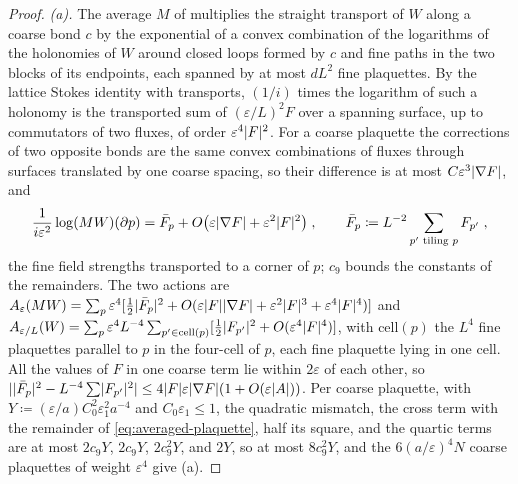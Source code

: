 \documentclass[11pt]{preprint}
\DeclarePairedDelimiter{\abs}{\lvert}{\rvert}
\numberwithin{equation}{section}
\theoremstyle{definition}
\theoremstyle{remark}
\theoremstyle{plain}
\begin{document}
\begin{proof}
\emph{(a).} The average $M$ of \cite[(0.4), p.~253]{BalabanRG1} multiplies the straight transport of $W$ along a coarse bond $c$ by the exponential of a convex combination of the logarithms of the holonomies of $W$ around closed loops formed by $c$ and fine paths in the two blocks of its endpoints, each spanned by at most $dL^2$ fine plaquettes. By the lattice Stokes identity with transports, $(1/i)$ times the logarithm of such a holonomy is the transported sum of $(\varepsilon/L)^2F$ over a spanning surface, up to commutators of two fluxes, of order $\varepsilon^4\abs F^2$. For a coarse plaquette the corrections of two opposite bonds are the same convex combinations of fluxes through surfaces translated by one coarse spacing, so their difference is at most $C\varepsilon^3\abs{\nabla F}$, and
\begin{equation}\label{eq:averaged-plaquette}
    \frac{1}{i\varepsilon^2}\log(MW)(\partial p) = \bar F_p + O\bigl(\varepsilon\abs{\nabla F} + \varepsilon^2\abs F^2\bigr)\;,
    \qquad
    \bar F_p \coloneqq L^{-2}\sum_{p' \text{ tiling } p}F_{p'}\;,
\end{equation}
the fine field strengths transported to a corner of $p$; $c_9$ bounds the constants of the remainders. The two actions are $A_\varepsilon(MW) = \sum_p\varepsilon^4[\frac12\abs{\bar F_p}^2 + O(\varepsilon\abs F\abs{\nabla F} + \varepsilon^2\abs F^3 + \varepsilon^4\abs F^4)]$ and $A_{\varepsilon/L}(W) = \sum_p\varepsilon^4L^{-4}\sum_{p' \in \mathrm{cell}(p)}[\frac12\abs{F_{p'}}^2 + O(\varepsilon^4\abs F^4)]$, with $\mathrm{cell}(p)$ the $L^4$ fine plaquettes parallel to $p$ in the four-cell of $p$, each fine plaquette lying in one cell. All the values of $F$ in one coarse term lie within $2\varepsilon$ of each other, so $\abs{\abs{\bar F_p}^2 - L^{-4}\sum\abs{F_{p'}}^2} \leq 4\abs F\varepsilon\abs{\nabla F}(1 + O(\varepsilon\abs A))$. Per coarse plaquette, with $Y \coloneqq (\varepsilon/a)C_0^2\varepsilon_1^2a^{-4}$ and $C_0\varepsilon_1 \leq 1$, the quadratic mismatch, the cross term with the remainder of \eqref{eq:averaged-plaquette}, half its square, and the quartic terms are at most $2c_9Y$, $2c_9Y$, $2c_9^2Y$, and $2Y$, so at most $8c_9^2Y$, and the $6(a/\varepsilon)^4N$ coarse plaquettes of weight $\varepsilon^4$ give (a).


\end{proof}
\end{document}
